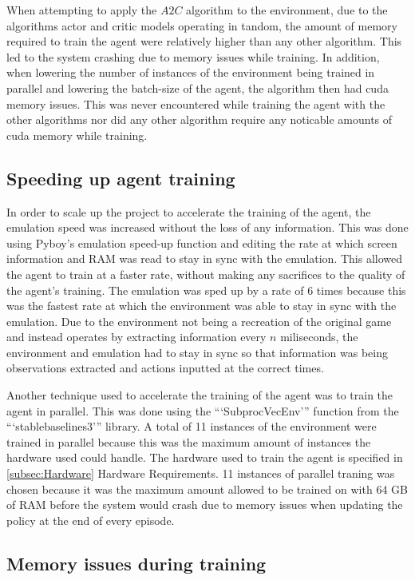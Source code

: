 When attempting to apply the $A2C$ algorithm to the environment, due to the algorithms actor and critic models operating in tandom, the amount of memory required to train the agent were relatively higher than any other algorithm. This led to the system crashing due to memory issues while training. In addition, when lowering the number of instances of the environment being trained in parallel and lowering the batch-size of the agent, the algorithm then had cuda memory issues. This was never encountered while training the agent with the other algorithms nor did any other algorithm require any noticable amounts of cuda memory while training.

\subsection{Speeding up agent training}

In order to scale up the project to accelerate the training of the agent, the emulation speed was increased without the loss of any information. This was done using Pyboy's emulation speed-up function and editing the rate at which screen information and RAM was read to stay in sync with the emulation. This allowed the agent to train at a faster rate, without making any sacrifices to the quality of the agent's training. The emulation was sped up by a rate of 6 times because this was the fastest rate at which the environment was able to stay in sync with the emulation. Due to the environment not being a recreation of the original game and instead operates by extracting information every $n$ miliseconds, the environment and emulation had to stay in sync so that information was being observations extracted and actions inputted at the correct times.

Another technique used to accelerate the training of the agent was to train the agent in parallel. This was done using the ```SubprocVecEnv''' function from the ```stablebaselines3''' library. A total of 11 instances of the environment were trained in parallel because this was the maximum amount of instances the hardware used could handle. The hardware used to train the agent is specified in \ref{subsec:Hardware} Hardware Requirements. 11 instances of parallel traning was chosen because it was the maximum amount allowed to be trained on with 64 GB of RAM before the system would crash due to memory issues when updating the policy at the end of every episode. 

\subsection{Memory issues during training}

